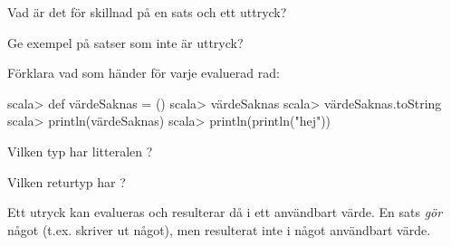 \SOLUTION

\TaskSolved \what

\begin{ConceptConnections}

\end{ConceptConnections}

%
%
%
%
%
%
%
%
%
%
%
%
%
%
%
%
%
%
%
%
%
%
%
%


\QUESTEND





\QUESTBEGIN

\Task \what

\Subtask Vad är det för skillnad på en sats och ett uttryck?

\Subtask Ge exempel på satser som inte är uttryck?

\Subtask Förklara vad som händer för varje evaluerad rad:
\begin{REPL}
scala> def värdeSaknas = ()
scala> värdeSaknas
scala> värdeSaknas.toString
scala> println(värdeSaknas)
scala> println(println("hej"))
\end{REPL}

\Subtask Vilken typ har litteralen \code{()}?

\Subtask Vilken returtyp har ?

\SOLUTION

\TaskSolved \what

\SubtaskSolved  Ett utryck kan evalueras och resulterar då i ett användbart värde. En sats \emph{gör} något (t.ex. skriver ut något), men resulterat inte i något användbart värde.

